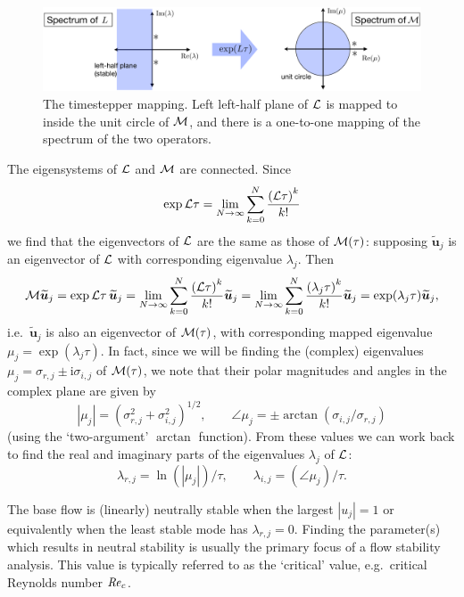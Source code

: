 \documentclass[11pt,a4paper]{report}
\newcommand\Rey{\mbox{\textit{Re}}}
\newcommand\ci{\mathrm{i}}
\newcommand\wt[1]{\widetilde{#1}}
\newcommand{\ie}{i.e.\ }
\newcommand{\eg}{e.g.\ }
\newcommand\Lop{{\cal L}}
\newcommand\Mop{{\cal M}}
\begin{document}
\begin{figure}
\begin{center}
\includegraphics[width=\textwidth]{mapping}
\end{center}
\caption{The timestepper mapping. Left left-half plane of $\Lop$ is
  mapped to inside the unit circle of $\Mop$, and there is a
  one-to-one mapping of the spectrum of the two operators.}
\label{fig.map}
\end{figure}

The eigensystems of $\Lop$ and $\Mop$ are connected.  Since
\begin{equation}
\exp \Lop\tau =
\lim_{N\to\infty}
\sum_{k=0}^{N}
\frac{\left(\Lop\tau\right)^k}{k!}
\end{equation}
we find that the eigenvectors of $\Lop$ are the same as those of
$\Mop(\tau)$: supposing $\wt{\bm{u}}_j$ is an eigenvector of $\Lop$ with
corresponding eigenvalue $\lambda_j$.  Then
\begin{equation}
\Mop\wt{\bm{u}}_j=
\exp \Lop\tau\,\wt{\bm{u}}_j=
\lim_{N\to\infty}\sum_{k=0}^N\frac{\left(\Lop\tau\right)^k}{k!}\wt{\bm{u}}_j=
\lim_{N\to\infty}\sum_{k=0}^N\frac{\left(\lambda_j \tau\right)^k}{k!}\wt{\bm{u}}_j=
\exp(\lambda_j\tau)\wt{\bm{u}}_j,
\end{equation}
\ie $\wt{\bm{u}}_j$ is also an eigenvector of $\Mop(\tau)$, with
corresponding mapped eigenvalue $\mu_j=\exp(\lambda_j\tau)$.  In fact,
since we will be finding the (complex) eigenvalues
$\mu_j=\sigma_{r,j}\pm\ci\sigma_{i,j}$ of $\Mop(\tau)$, we note that
their polar magnitudes and angles in the complex plane are given by
\begin{equation}
|\mu_j|=(\sigma_{r,j}^2+\sigma_{i,j}^2)^{1/2},\qquad
\angle\mu_j=\pm\arctan(\sigma_{i,j}/\sigma_{r,j})
\end{equation}
(using the `two-argument' $\arctan$ function).  From these values we
can work back to find the real and imaginary parts of the eigenvalues
$\lambda_j$ of $\Lop$:
\begin{equation}
\lambda_{r,j}=\ln(|\mu_j|)/\tau,\qquad
\lambda_{i,j}=(\angle\mu_j)/\tau.
\label{eq.convert}
\end{equation}

The base flow is (linearly) neutrally stable when the largest
$|u_j|=1$ or equivalently when the least stable mode has
$\lambda_{r,j}=0$.  Finding the parameter(s) which results in neutral
stability is usually the primary focus of a flow stability
analysis. This value is typically referred to as the `critical' value,
\eg critical Reynolds number $\Rey_c$.
\end{document}

